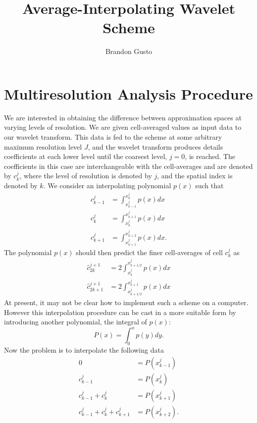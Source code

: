 \documentclass[10.5pt]{article}
\begin{document}
\title{Average-Interpolating Wavelet Scheme}
\author{Brandon Gusto}
\maketitle

\section*{Multiresolution Analysis Procedure}
We are interested in obtaining the difference between approximation spaces at varying levels of resolution. We 
are given cell-averaged values as input data to our wavelet transform. This data is fed to the scheme at some arbitrary maximum
resolution level $J$, and the wavelet transform produces details coefficients at each lower level until the coarsest level,
$j=0$, is reached. The coefficients in this case are interchangeable with the cell-averages and are denoted by $c^{j}_{k}$,
where the level of resolution is denoted by $j$, and the spatial index is denoted by $k$. We consider an interpolating
polynomial $p(x)$ such that 
\begin{align}
    c^{j}_{k-1} &= \int_{x^{j}_{k-1}}^{x^{j}_{k}} p(x) dx \\
    c^{j}_{k} &= \int_{x^{j}_{k}}^{x^{j}_{k+1}} p(x) dx \\
    c^{j}_{k+1} &= \int_{x^{j}_{k+1}}^{x^{j}_{k+2}} p(x) dx.
\end{align}
The polynomial $p(x)$ should then predict the finer cell-averages of cell $c^{j}_{k}$ as
\begin{align}
    \hat{c}^{j+1}_{2k} &= 2 \int_{x^{j}_{k}}^{x^{j}_{k+1/2}} p(x) dx \\
    \hat{c}^{j+1}_{2k+1} &= 2 \int_{x^{j}_{k+1/2}}^{x^{j}_{k+1}} p(x) dx
\end{align}
At present, it may not be clear how to implement such a scheme on a computer. However this interpolation procedure
can be cast in a more suitable form by introducing another polynomial, the integral of $p(x)$:
\begin{equation}
	P(x) = \int_{0}^{x} p(y) dy.
\end{equation}
Now the problem is to interpolate the following data
\begin{align}
    0 &= P(x^{j}_{k-1}) \\
    c^{j}_{k-1} &= P(x^{j}_{k}) \\
    c^{j}_{k-1} + c^{j}_{k} &= P(x^{j}_{k+1}) \\
    c^{j}_{k-1} + c^{j}_{k} + c^{j}_{k+1} &= P(x^{j}_{k+2}).
\end{align}
\end{document}
